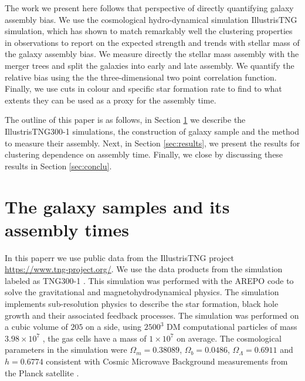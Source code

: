 \documentclass{aa}
\begin{document}
The work we present here follows that perspective of directly
quantifying galaxy assembly bias.
We use the cosmological hydro-dynamical simulation IllustrisTNG simulation,
which has shown to match remarkably well the clustering properties in
observations \citep{2018MNRAS.475..676S} to report on the expected
strength and trends with stellar mass of the galaxy assembly bias.
We measure directly the stellar mass assembly with the merger trees
and split the galaxies into early and late assembly.
We quantify the relative bias using the the three-dimensional two point
correlation function.
Finally, we use cuts in colour and specific star formation rate to
find to what extents they can be used as a proxy for the assembly
time. 

The outline of this paper is as follows, in Section \ref{sec:simul}
we describe the IllustrisTNG300-1 simulations, the construction of
galaxy sample and the method to measure their assembly.
Next, in Section \ref{sec:results}, we present the results for
clustering dependence on assembly time.
Finally, we close by discussing these results in Section \ref{sec:conclu}. 


\section{The galaxy samples and its assembly times}
\label{sec:simul} 

In this paperr we use public data from the IllustrisTNG project
\url{https://www.tng-project.org/}. 
We use the data products from the simulation labeled as TNG300-1 
\citep{2019ComAC...6....2N}.
This simulation was performed with the AREPO code
\citep{2010MNRAS.401..791S} to solve the 
gravitational and magnetohydrodynamical physics. 
The simulation implements sub-resolution physics to describe the
star formation, black hole growth and their associated feedback
processes. 
The simulation was performed on a cubic volume of $205$ \Mpch on a
side, using  $2500^3$ DM computational particles of mass $3.98 \times
10^7$ \Msunh, the gas cells have a mass of $1 \times 10^7$ \Msunh on
average.
The cosmological parameters in the simulation were $\Omega_m=0.38089$,
$\Omega_b=0.0486$, $\Omega_\Lambda= 0.6911$ and $h=0.6774$ consistent
with Cosmic Microwave Background measurements from the Planck satellite
\citep{2016A&A...594A..13P}.  
\end{document}
